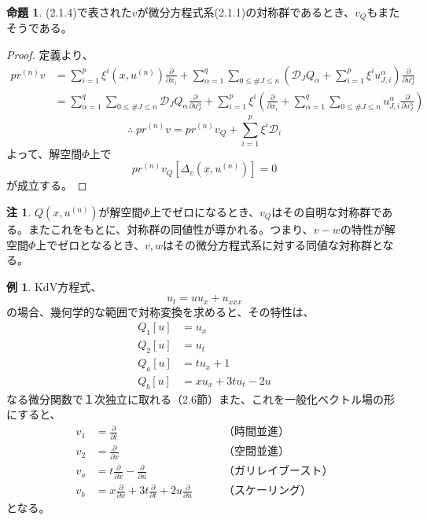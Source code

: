 \documentclass[a4paper, 11pt]{report}
\theoremstyle{definition}
\newtheorem{proposition}{命題}[section]
\newtheorem*{remark*}{注}
\newtheorem*{example*}{例}
\begin{document}
\begin{proposition}
 (2.1.4)で表された$v$が微分方程式系(2.1.1)の対称群であるとき、$v_Q$もまたそうである。
\end{proposition}

\begin{proof}
 定義より、
\begin{align*}
pr^{(n)}v &= \sum ^p_{i=1}\xi^i(x,u^{(n)})\frac{\partial }{\partial x_i} + \sum ^q_{\alpha=1}\sum _{0\leq \#J\leq n}(\mathcal{D}_JQ_\alpha + \sum ^p_{i=1}\xi^iu^\alpha_{J,i})\frac{\partial }{\partial u^\alpha_J} \\
&= \sum ^q_{\alpha=1}\sum _{0\leq \#J\leq n}\mathcal{D}_JQ_\alpha\frac{\partial }{\partial u^\alpha_J} + \sum ^p_{i=1}\xi^i(\frac{\partial }{\partial x_i} + \sum ^q_{\alpha=1}\sum _{0\leq \#J\leq n}u^\alpha_{J,i}\frac{\partial }{\partial u^\alpha_J})
\end{align*}
\begin{equation}
\therefore \; pr^{(n)}v = pr^{(n)}v_Q + \sum ^p_{i=1}\xi^i\mathcal{D}_i %
\end{equation}
よって、解空間$\Phi$上で
\begin{equation*}
pr^{(n)}v_Q[\varDelta_v(x,u^{(n)})] = 0
\end{equation*}
が成立する。
\end{proof}

\begin{remark*}
 $Q(x,u^{(n)})$が解空間$\Phi$上でゼロになるとき、$v_Q$はその自明な対称群である。またこれをもとに、対称群の同値性が導かれる。つまり、$v-w$の特性が解空間$\Phi$上でゼロとなるとき、$v,w$はその微分方程式系に対する同値な対称群となる。
\end{remark*}

\begin{example*}
 KdV方程式、
\begin{equation}
u_t = uu_x + u_{xxx}  %
\end{equation}
の場合、幾何学的な範囲で対称変換を求めると、その特性は、
\begin{align}
Q_1[u] &= u_x \nonumber\\
Q_2[u] &= u_t \nonumber\\
Q_a[u] &= tu_x + 1 \nonumber\\
Q_b[u] &= xu_x + 3tu_t - 2u %
\end{align}
なる微分関数で１次独立に取れる（2.6節）また、これを一般化ベクトル場の形にすると、
\begin{align*}
v_1 &= \frac{\partial}{\partial t} \qquad &\text{（時間並進）}\\
v_2 &= \frac{\partial}{\partial x} \qquad &\text{（空間並進）}\\
v_a &= t\frac{\partial}{\partial x} - \frac{\partial}{\partial u} \qquad &\text{（ガリレイブースト）}\\
v_b &= x\frac{\partial}{\partial x} + 3t\frac{\partial}{\partial t} + 2u\frac{\partial}{\partial u} \qquad &\text{（スケーリング）}
\end{align*}
となる。
\end{example*}
\end{document}
